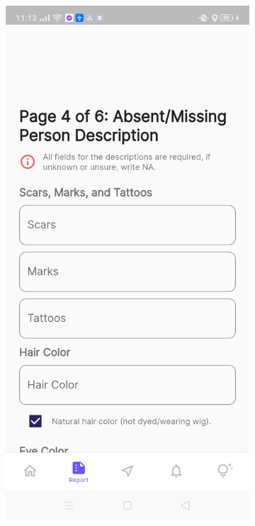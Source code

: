 \begin{figure}[!h]
    \centering
    \begin{subfigure}[c]{0.30\linewidth}
        \centering
        \includegraphics[scale=0.15]{figures/Chapter4/Main/p4-1.jpg}

\end{subfigure}
\end{figure}
